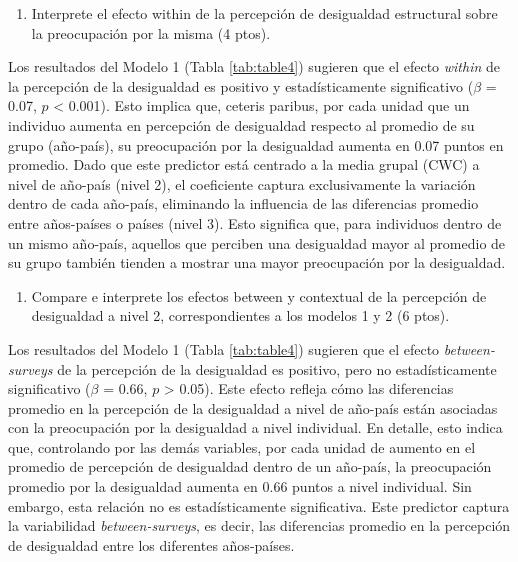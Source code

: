 \documentclass[
  12pt,
  a4paper,
]{article}
\providecommand{\tightlist}{%
  \setlength{\itemsep}{0pt}\setlength{\parskip}{0pt}}
\begin{document}
\begin{enumerate}
\def\labelenumi{\alph{enumi})}
\setcounter{enumi}{3}
\tightlist
\item
  Interprete el efecto within de la percepción de desigualdad estructural sobre la preocupación por la misma (4 ptos).
\end{enumerate}

Los resultados del Modelo 1 (Tabla \ref{tab:table4}) sugieren que el efecto \emph{within} de la percepción de la desigualdad es positivo y estadísticamente significativo (\(\beta\) = 0.07, \(p\) \textless{} 0.001). Esto implica que, ceteris paribus, por cada unidad que un individuo aumenta en percepción de desigualdad respecto al promedio de su grupo (año-país), su preocupación por la desigualdad aumenta en 0.07 puntos en promedio. Dado que este predictor está centrado a la media grupal (CWC) a nivel de año-país (nivel 2), el coeficiente captura exclusivamente la variación dentro de cada año-país, eliminando la influencia de las diferencias promedio entre años-países o países (nivel 3). Esto significa que, para individuos dentro de un mismo año-país, aquellos que perciben una desigualdad mayor al promedio de su grupo también tienden a mostrar una mayor preocupación por la desigualdad.

\begin{enumerate}
\def\labelenumi{\alph{enumi})}
\setcounter{enumi}{4}
\tightlist
\item
  Compare e interprete los efectos between y contextual de la percepción de desigualdad a nivel 2, correspondientes a los modelos 1 y 2 (6 ptos).
\end{enumerate}

Los resultados del Modelo 1 (Tabla \ref{tab:table4}) sugieren que el efecto \emph{between-surveys} de la percepción de la desigualdad es positivo, pero no estadísticamente significativo (\(\beta\) = 0.66, \(p\) \textgreater{} 0.05). Este efecto refleja cómo las diferencias promedio en la percepción de la desigualdad a nivel de año-país están asociadas con la preocupación por la desigualdad a nivel individual. En detalle, esto indica que, controlando por las demás variables, por cada unidad de aumento en el promedio de percepción de desigualdad dentro de un año-país, la preocupación promedio por la desigualdad aumenta en 0.66 puntos a nivel individual. Sin embargo, esta relación no es estadísticamente significativa. Este predictor captura la variabilidad \emph{between-surveys}, es decir, las diferencias promedio en la percepción de desigualdad entre los diferentes años-países.
\end{document}
